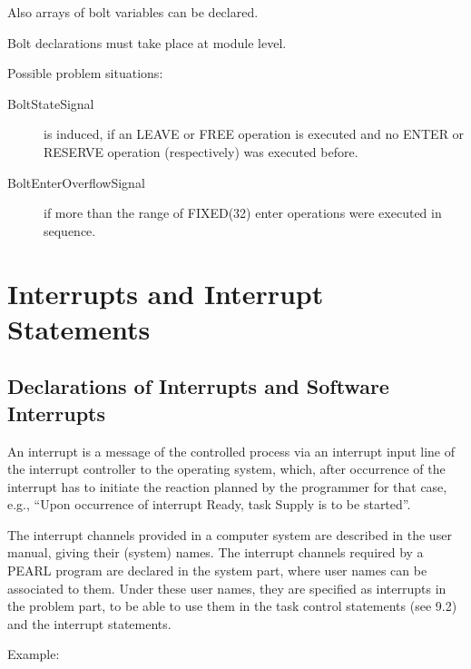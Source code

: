 Also arrays of bolt variables can be declared.

Bolt declarations must take place at module level.

Possible problem situations:

\begin{description}
\item[BoltStateSignal] is induced, if an LEAVE or FREE operation
   is executed and no ENTER or RESERVE operation (respectively) 
   was executed before.
\item [BoltEnterOverflowSignal] if more than the range of FIXED(32) enter
   operations were executed in sequence.
\end{description}



\section{Interrupts and Interrupt Statements}   %
\label{sec_interrupts}

\subsection{Declarations of Interrupts and Software Interrupts}    %

An interrupt is a message of the controlled process via an interrupt
input line of the interrupt controller to the operating system, which,
after occurrence of the interrupt has to initiate the reaction planned
by the programmer for that case, e.g., ``Upon occurrence of interrupt
Ready, task Supply is to be started''.

The interrupt channels provided in a computer system are described in the
user manual, giving their (system) names. The interrupt channels required
by a PEARL program are declared in the system part, where user names can
be associated to them. Under these user names, they are specified as
interrupts in the problem part, to be able to use them in the task
control statements (see 9.2) and the interrupt statements.

Example:

